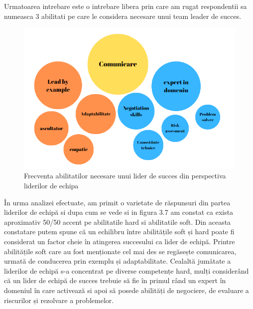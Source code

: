 \documentclass[a4paper, 12pt]{article}
\begin{document}
	\quad Urmatoarea intrebare este o intrebare libera prin care am rugat respondentii sa numeasca 3 abilitati pe care le considera necesare unui team leader de succes. 

\begin{figure}[!htb]
			\centering
			\includegraphics[width=15cm, height=10 cm]{"figures/team leaders succes.png"}
			\caption {Frecventa abilitatilor necesare unui lider de succes din perspectiva liderilor de echipa}\label{fig:four}
	
		\end{figure}



	\quad În urma analizei efectuate, am primit o varietate de răspunsuri din partea liderilor de echipă si dupa cum se vede si in figura 3.7 am constat ca exista aproximativ 50/50 accent pe abilitatile hard si abilitatile soft. Din aceasta constatare putem spune că un echilibru între abilitățile soft și hard poate fi considerat un factor cheie în atingerea succesului ca lider de echipă. Printre abilitățile soft care au fost menționate cel mai des se regăsește comunicarea, urmată de conducerea prin exemplu și adaptabilitate. Cealaltă jumătate a liderilor de echipă s-a concentrat pe diverse competențe hard, mulți considerând că un lider de echipă de succes trebuie să fie în primul rând un expert în domeniul în care activează si apoi să posede abilități de negociere, de evaluare a riscurilor și rezolvare a problemelor.
\end{document}
